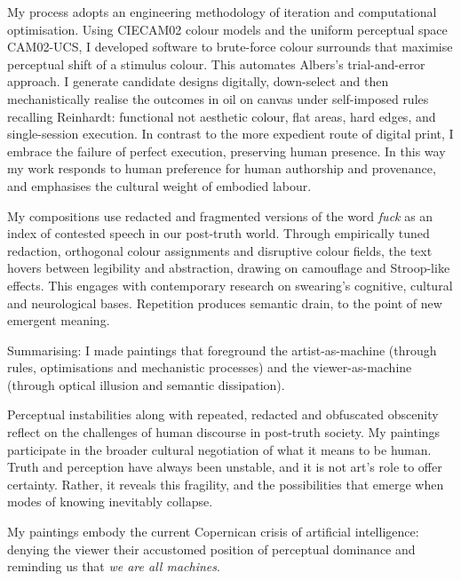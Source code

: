 \documentclass[12pt]{article}
\begin{document}
My process adopts an engineering methodology of iteration and
computational optimisation. Using CIECAM02 colour models and the
uniform perceptual space
CAM02-UCS\autocite{Luo2001CIECAM02,CIE1592004,CIE1976,CIE1978Uniform,Luo2001CIEDE2000},
I developed software\autocite{grant2025colourshift} to brute-force colour
surrounds that maximise perceptual shift of a stimulus colour. This
automates Albers’s trial-and-error approach\autocite{albers}. I generate
candidate designs digitally, down-select and then mechanistically
realise the outcomes in oil on canvas under self-imposed rules
recalling Reinhardt\autocite{artasart}: functional not aesthetic colour,
flat areas, hard edges, and single-session execution. In contrast to the more expedient route of digital print, I embrace the failure of perfect execution, preserving
human presence\autocite{rosenberg1952american,bois1990painting}. In this way my
work responds to human preference for human authorship and
provenance\autocite{benjamin1969art,horton2023bias,demmer2023does},
and emphasises the cultural weight of embodied
labour\autocite{adorno1970aesthetic,sennett2008craftsman}.

My compositions use redacted and fragmented versions of the word
\emph{fuck} as an index of contested
speech\autocite{atkins2006censoring,lukianoff2023cancelling} in our
post-truth world. Through empirically tuned redaction, orthogonal
colour assignments and disruptive colour fields, the text hovers
between legibility and abstraction, drawing on camouflage and
Stroop-like effects. This engages with contemporary research on
swearing’s cognitive, cultural and neurological
bases\autocite{reiman2022swearfluency,jay2015taboo,pinker2017moral,bergen2018what}. Repetition
produces semantic
drain\autocite{barthes1957mythologies,derrida1972dissemination}, to the
point of new emergent
meaning\autocite{deleuze1968difference,baudrillard1981simulacra}.

Summarising: I made paintings that foreground the artist-as-machine
(through rules, optimisations and mechanistic processes) and the
viewer-as-machine (through optical illusion and semantic dissipation).

Perceptual instabilities along with repeated, redacted and obfuscated
obscenity reflect on the challenges of human discourse in post-truth
society. My paintings participate in the broader cultural negotiation
of what it means to be human. Truth and perception have always been
unstable, and it is not art's role to offer certainty. Rather, it
reveals this fragility, and the possibilities that emerge when modes
of knowing inevitably collapse.

My paintings embody the current Copernican crisis of artificial
intelligence: denying the viewer their accustomed position of
perceptual dominance and reminding us that \emph{we are all machines}.

\newpage
\nocite{*}
\printbibliography
\end{document}
